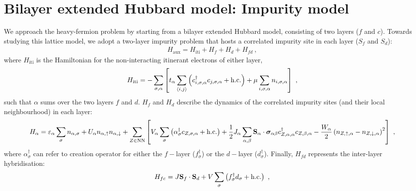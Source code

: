 \documentclass[%
reprint,
superscriptaddress,
groupedaddress,
superscriptaddress,
onecolumn,
]{revtex4-2}
\begin{document}
\section{Bilayer extended Hubbard model: Impurity model}
We approach the heavy-fermion problem by starting from a bilayer extended Hubbard model, consisting of two layers (\(f\) and \(c\)). Towards studying this lattice model, we adopt a two-layer impurity problem that hosts a correlated impurity site in each layer (\(S_f\) and \(S_d\)):
\begin{equation}\begin{aligned}
	H_\text{aux} = H_\text{iti} + H_f + H_d + H_{fd}~,
\end{aligned}\end{equation}
where \(H_\text{iti}\) is  the Hamiltonian for the non-interacting itinerant electrons of either layer,
\begin{equation}\begin{aligned}
H_\text{iti} = -\sum_{\sigma,\alpha}\left[t_\alpha\sum_{\braket{i,j}}\left(c^\dagger_{i,\sigma,\alpha}c_{j,\sigma,\alpha} + \text{h.c.}\right) + \mu\sum_{i,\sigma,\alpha}n_{i,\sigma,\alpha}\right] ~,
\end{aligned}\end{equation}
such that \(\alpha\) sums over the two layers \(f\) and \(d\). \(H_f\) and \(H_d\) describe the dynamics of the correlated impurity sites (and their local neighbourhood) in each layer:
\begin{equation}\begin{aligned}
	H_\alpha = \varepsilon_\alpha \sum_\sigma n_{\alpha,\sigma} + U_\alpha n_{\alpha,\uparrow} n_{\alpha,\downarrow} + \sum_{Z \in \text{NN}}\left[V_\alpha\sum_{\sigma}\left(\alpha^\dagger_{\sigma} c_{Z,\sigma,\alpha} + \text{h.c.}\right) + \frac{1}{2}J_\alpha\sum_{\alpha,\beta}{\bf S}_\alpha \cdot {\boldsymbol{\sigma}}_{\alpha\beta}c^\dagger_{Z,\alpha,\alpha}c_{Z,\beta,\alpha} - \frac{W_\alpha}{2} \left(n_{Z,\uparrow,\alpha} - n_{Z,\downarrow,\alpha}\right)^2\right] ~,\\
\end{aligned}\end{equation}
where \(\alpha^\dagger_{\sigma}\) can refer to creation operator for either the \(f-\)layer (\(f^\dagger_{\sigma}\)) or the \(d-\)layer (\(d^\dagger_{\sigma}\)). Finally, \(H_{fd}\) represents the inter-layer hybridisation:
\begin{equation}\begin{aligned}
	H_{fc} = J{\bf S}_f \cdot {\bf S}_d + V \sum_\sigma\left(f^\dagger_{\sigma} d_{\sigma} + \text{h.c.}\right)~,\\
\end{aligned}\end{equation}
\end{document}
